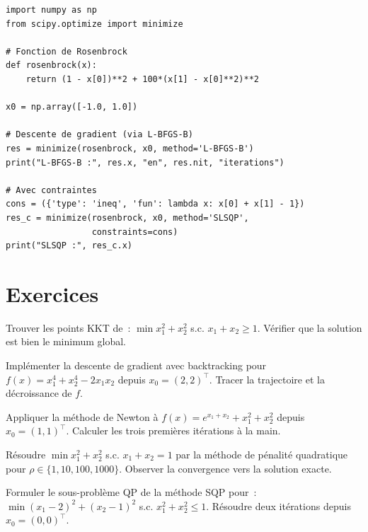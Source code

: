 \begin{codeblock}[title=\textbf{Optimisation non lin\'eaire avec SciPy}]
\begin{verbatim}
import numpy as np
from scipy.optimize import minimize

# Fonction de Rosenbrock
def rosenbrock(x):
    return (1 - x[0])**2 + 100*(x[1] - x[0]**2)**2

x0 = np.array([-1.0, 1.0])

# Descente de gradient (via L-BFGS-B)
res = minimize(rosenbrock, x0, method='L-BFGS-B')
print("L-BFGS-B :", res.x, "en", res.nit, "iterations")

# Avec contraintes
cons = ({'type': 'ineq', 'fun': lambda x: x[0] + x[1] - 1})
res_c = minimize(rosenbrock, x0, method='SLSQP',
                 constraints=cons)
print("SLSQP :", res_c.x)
\end{verbatim}
\end{codeblock}

\section{Exercices}

\begin{exercice}
Trouver les points KKT de~: $\min x_1^2 + x_2^2$ s.c. $x_1 + x_2 \geq 1$.
V\'erifier que la solution est bien le minimum global.
\end{exercice}

\begin{exercice}
Impl\'ementer la descente de gradient avec backtracking pour
$f(x) = x_1^4 + x_2^4 - 2x_1 x_2$ depuis $x_0 = (2, 2)^\top$.
Tracer la trajectoire et la d\'ecroissance de $f$.
\end{exercice}

\begin{exercice}
Appliquer la m\'ethode de Newton \`a $f(x) = e^{x_1 + x_2} + x_1^2 + x_2^2$
depuis $x_0 = (1, 1)^\top$. Calculer les trois premi\`eres it\'erations \`a
la main.
\end{exercice}

\begin{exercice}
R\'esoudre $\min x_1^2 + x_2^2$ s.c. $x_1 + x_2 = 1$ par la m\'ethode de
p\'enalit\'e quadratique pour $\rho \in \{1, 10, 100, 1000\}$. Observer la
convergence vers la solution exacte.
\end{exercice}

\begin{exercice}
Formuler le sous-probl\`eme QP de la m\'ethode SQP pour~:
$\min (x_1 - 2)^2 + (x_2 - 1)^2$ s.c. $x_1^2 + x_2^2 \leq 1$.
R\'esoudre deux it\'erations depuis $x_0 = (0, 0)^\top$.
\end{exercice}
